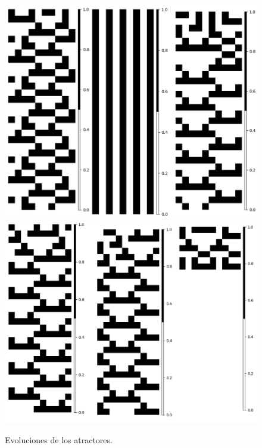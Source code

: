 \documentclass[11pt]{article}
\begin{document}
			\begin{figure}[H]
			\centering
			\includegraphics[scale=0.3]{resources/Atractores22/atractor_22_size_10_res.png}
			\includegraphics[scale=0.3]{resources/Atractores22/atractor_22_size_10_res1.png}
			\caption{Evoluciones de los atractores.}\label{fig:picture}
			\end{figure}
\end{document}
